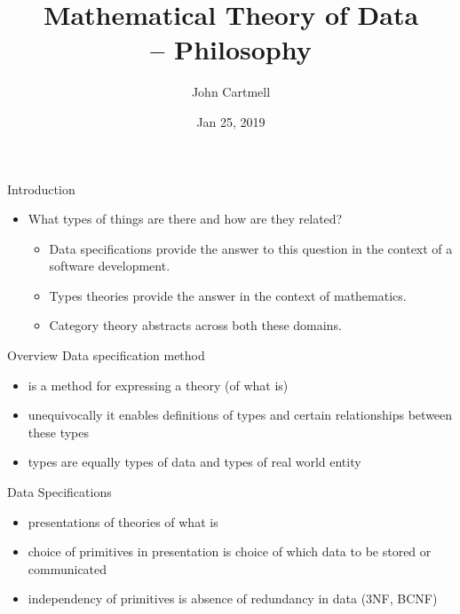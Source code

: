 \documentclass[xcolor=pst,dvips]{beamer}   %
\title[John Cartmell]{Mathematical Theory of Data \\ -- Philosophy}
\author{John Cartmell}
\institute{Ad Otium}
\date{Jan 25, 2019}
\begin{document}
\begin{frame}
\titlepage
\end{frame}


\begin{frame}{Introduction}
\begin{itemize}
\item
What types of things are there and how are they related? 
\begin{itemize}
\pause \item Data specifications provide the answer to this question in the context of a software development. 
\pause \item Types theories provide the answer in the context of mathematics. 
\pause \item Category theory abstracts across both these domains.
\end{itemize}
\end{itemize}
\end{frame}

\begin{frame}{Overview}
Data specification method 
\begin{itemize}
\item is a method for expressing a  theory (of what is)
\item unequivocally it enables definitions of types and certain relationships between these types
\item types are equally types of data and types of real world entity
\end{itemize}
\end{frame}

\begin{frame}{Data Specifications}
\begin{itemize}
\item presentations of theories of what is
\item choice of primitives in presentation is choice of which data to be stored or communicated
\item independency of primitives is absence of redundancy in data (3NF, BCNF)
\end{itemize}
\end{frame}
\end{document}
